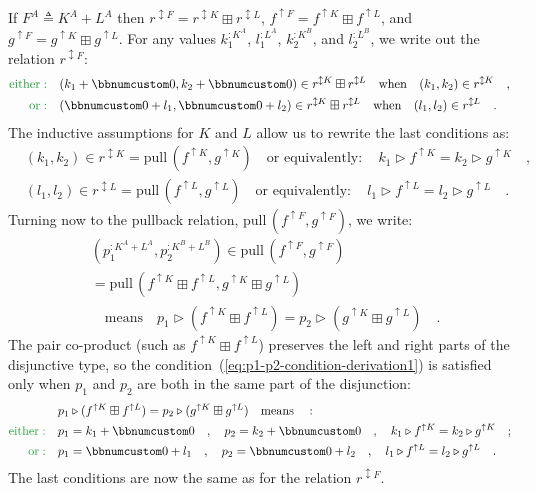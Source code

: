 If $F^{A}\triangleq K^{A}+L^{A}$ then $r^{\updownarrow F}=r^{\updownarrow K}\boxplus r^{\updownarrow L}$,
$f^{\uparrow F}=f^{\uparrow K}\boxplus f^{\uparrow L}$, and $g^{\uparrow F}=g^{\uparrow K}\boxplus g^{\uparrow L}$.
For any values $k_{1}^{:K^{A}}$, $l_{1}^{:L^{A}}$, $k_{2}^{:K^{B}}$,
and $l_{2}^{:L^{B}}$, we write out the relation $r^{\updownarrow F}$:
\begin{align*}
{\color{greenunder}\text{either}:}\quad & (k_{1}+\bbnum 0,k_{2}+\bbnum 0)\in r^{\updownarrow K}\boxplus r^{\updownarrow L}\quad\text{when}\quad(k_{1},k_{2})\in r^{\updownarrow K}\quad,\\
{\color{greenunder}\text{or}:}\quad & (\bbnum 0+l_{1},\bbnum 0+l_{2})\in r^{\updownarrow K}\boxplus r^{\updownarrow L}\quad\text{when}\quad(l_{1},l_{2})\in r^{\updownarrow L}\quad.
\end{align*}
The inductive assumptions for $K$ and $L$ allow us to rewrite the
last conditions as:
\begin{align*}
 & (k_{1},k_{2})\in r^{\updownarrow K}=\text{pull}\,(f^{\uparrow K},g^{\uparrow K})\quad\text{or equivalently}:\quad k_{1}\triangleright f^{\uparrow K}=k_{2}\triangleright g^{\uparrow K}\quad,\\
 & (l_{1},l_{2})\in r^{\updownarrow L}=\text{pull}\,(f^{\uparrow L},g^{\uparrow L})\quad\text{or equivalently}:\quad l_{1}\triangleright f^{\uparrow L}=l_{2}\triangleright g^{\uparrow L}\quad.
\end{align*}
Turning now to the pullback relation, $\text{pull}\,(f^{\uparrow F},g^{\uparrow F})$,
we write:
\begin{align}
 & (p_{1}^{:K^{A}+L^{A}},p_{2}^{:K^{B}+L^{B}})\in\text{pull}\,(f^{\uparrow F},g^{\uparrow F})\nonumber \\
 & =\text{pull}\,(f^{\uparrow K}\boxplus f^{\uparrow L},g^{\uparrow K}\boxplus g^{\uparrow L})\\
 & \quad\text{means}\quad p_{1}\triangleright(f^{\uparrow K}\boxplus f^{\uparrow L})=p_{2}\triangleright(g^{\uparrow K}\boxplus g^{\uparrow L})\quad.\label{eq:p1-p2-condition-derivation1}
\end{align}
The pair co-product (such as $f^{\uparrow K}\boxplus f^{\uparrow L}$)
preserves the left and right parts of the disjunctive type, so the
condition~(\ref{eq:p1-p2-condition-derivation1}) is satisfied only
when $p_{1}$ and $p_{2}$ are both in the same part of the disjunction:
\begin{align*}
 & p_{1}\triangleright(f^{\uparrow K}\boxplus f^{\uparrow L})=p_{2}\triangleright(g^{\uparrow K}\boxplus g^{\uparrow L})\quad\text{means}\quad:\\
{\color{greenunder}\text{either}:}\quad & p_{1}=k_{1}+\bbnum 0\quad,\quad p_{2}=k_{2}+\bbnum 0\quad,\quad k_{1}\triangleright f^{\uparrow K}=k_{2}\triangleright g^{\uparrow K}\quad;\\
{\color{greenunder}\text{or}:}\quad & p_{1}=\bbnum 0+l_{1}\quad,\quad p_{2}=\bbnum 0+l_{2}\quad,\quad l_{1}\triangleright f^{\uparrow L}=l_{2}\triangleright g^{\uparrow L}\quad.
\end{align*}
The last conditions are now the same as for the relation $r^{\updownarrow F}$.

